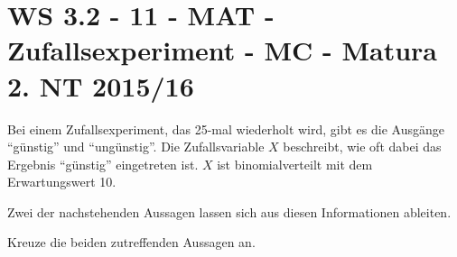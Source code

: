 \section{WS 3.2 - 11 - MAT - Zufallsexperiment - MC - Matura 2. NT 2015/16}

\begin{beispiel}{0} %
Bei einem Zufallsexperiment, das 25-mal wiederholt wird, gibt es die Ausgänge "`günstig"' und
"`ungünstig"'. Die Zufallsvariable $X$ beschreibt, wie oft dabei das Ergebnis "`günstig"' eingetreten ist. $X$ ist binomialverteilt mit dem Erwartungswert 10.\leer

Zwei der nachstehenden Aussagen lassen sich aus diesen Informationen ableiten.

Kreuze die beiden zutreffenden Aussagen an. \leer

\end{beispiel}
